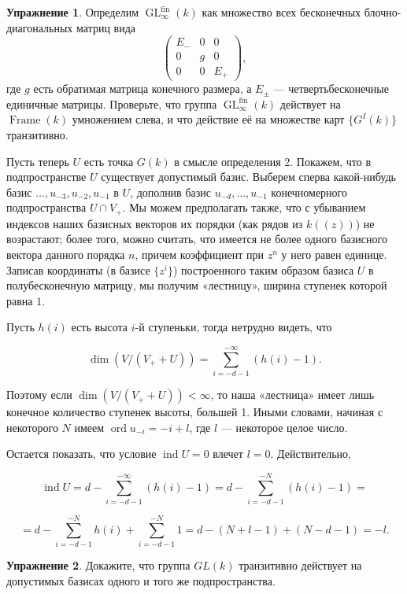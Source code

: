 \documentclass{article}
\theoremstyle{definition}
\theoremstyle{definition} %
\theoremstyle{remark}     %
\theoremstyle{definition}
\theoremstyle{definition}
\theoremstyle{definition}
\theoremstyle{definition}
\theoremstyle{definition}
\theoremstyle{definition}
\theoremstyle{definition}
\theoremstyle{definition}
\newtheorem{exercise}{Упражнение}[section]
\begin{document}
\begin{exercise}
  Определим \(\operatorname{GL}^{\text{fin}}_\infty(k)\) как множество всех бесконечных блочно-диагональных матриц вида
  \[
  \begin{pmatrix}
    E_- & 0 & 0 \\
    0 & g & 0 \\
    0 & 0 & E_+
  \end{pmatrix},
  \]
  где \(g\) есть обратимая матрица конечного размера, а \(E_\pm\) — четвертьбесконечные единичные матрицы. Проверьте, что группа \(\operatorname{GL}^{\text{fin}}_\infty(k)\) действует на \(\operatorname{Frame}(k)\) умножением слева, и что действие её на множестве карт \(\{G^I(k)\}\) транзитивно.
\end{exercise}

Пусть теперь \(U\) есть точка \(G(k)\) в смысле определения 2. Покажем, что в подпространстве \(U\) существует допустимый базис. Выберем сперва какой-нибудь базис \(\dots, u_{-3}, u_{-2}, u_{-1}\) в \(U\), дополнив базис \(u_{-d}, \dots, u_{-1}\) конечномерного подпространства \(U \cap V_+\). Мы можем предполагать также, что с убыванием индексов наших базисных векторов их порядки (как рядов из \(k((z))\)) не возрастают; более того, можно считать, что имеется не более одного базисного вектора данного порядка \(n\), причем коэффициент при \(z^n\) у него равен единице. Записав координаты (в базисе \(\{z^i\}\)) построенного таким образом базиса \(U\) в полубесконечную матрицу, мы получим «лестницу», ширина ступенек которой равна \(1\).

Пусть \(h(i)\) есть высота \(i\)-й ступеньки, тогда нетрудно видеть, что


\[
\dim(V/(V_+ + U)) = \sum_{i=-d-1}^{-\infty} (h(i) - 1).
\]


Поэтому если \(\dim(V/(V_+ + U)) < \infty\), то наша «лестница» имеет лишь конечное количество ступенек высоты, большей 1. Иными словами, начиная с некоторого \(N\) имеем \(\operatorname{ord} u_{-i} = -i + l\), где \(l\) — некоторое целое число.

Остается показать, что условие \(\operatorname{ind} U = 0\) влечет \(l = 0\). Действительно,

\[
\operatorname{ind} U = d - \sum_{i=-d-1}^{-\infty} (h(i) - 1) = d - \sum_{i=-d-1}^{-N} (h(i) - 1) =
\]

\[
= d - \sum_{i=-d-1}^{-N} h(i) + \sum_{i=-d-1}^{-N} 1 = d - (N + l - 1) + (N - d - 1) = -l.
\]

\begin{exercise}
  Докажите, что группа \( GL(k) \) транзитивно действует на допустимых базисах одного и того же подпространства.
\end{exercise}
\end{document}
